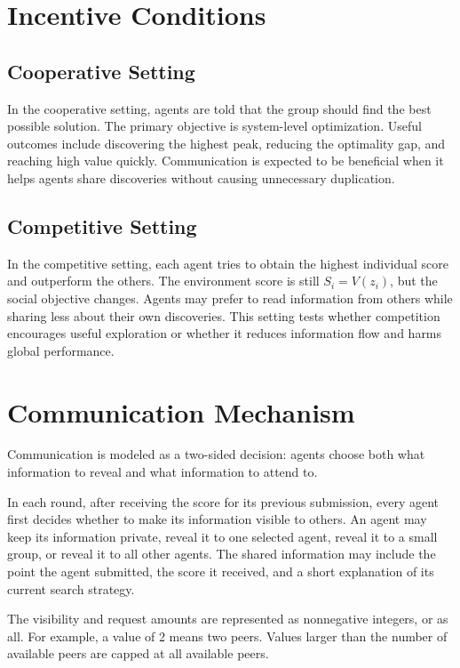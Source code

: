\documentclass[11pt]{article}
\begin{document}
\section{Incentive Conditions}

\subsection{Cooperative Setting}

In the cooperative setting, agents are told that the group should find the best possible solution. The primary objective is system-level optimization. Useful outcomes include discovering the highest peak, reducing the optimality gap, and reaching high value quickly. Communication is expected to be beneficial when it helps agents share discoveries without causing unnecessary duplication.

\subsection{Competitive Setting}

In the competitive setting, each agent tries to obtain the highest individual score and outperform the others. The environment score is still $S_i = V(z_i)$, but the social objective changes. Agents may prefer to read information from others while sharing less about their own discoveries. This setting tests whether competition encourages useful exploration or whether it reduces information flow and harms global performance.

\section{Communication Mechanism}

Communication is modeled as a two-sided decision: agents choose both what information to reveal and what information to attend to.

In each round, after receiving the score for its previous submission, every agent first decides whether to make its information visible to others. An agent may keep its information private, reveal it to one selected agent, reveal it to a small group, or reveal it to all other agents. The shared information may include the point the agent submitted, the score it received, and a short explanation of its current search strategy.

The visibility and request amounts are represented as nonnegative integers, or as all. For example, a value of 2 means two peers. Values larger than the number of available peers are capped at all available peers.
\end{document}
